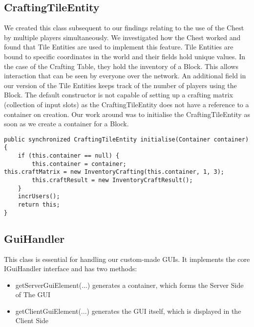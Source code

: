 \subsection{CraftingTileEntity}
We created this class subsequent to our findings relating to the use of the Chest by multiple players simultaneously. We investigated how the Chest worked and found that Tile Entities are used to implement this feature.\newline
Tile Entities are bound to specific coordinates in the world and their fields hold unique values. In the case of the Crafting Table, they hold the inventory of a Block. This allows interaction that can be seen by everyone over the network.\newline
An additional field in our version of the Tile Entities keeps track of the number of players using the Block.\newline
The default constructor is not capable of setting up a crafting matrix (collection of input slots) as the CraftingTileEntity does not have a reference to a container on creation. Our work around was to initialise the CraftingTileEntity as soon as we create a container for a Block.\newline
\begin{lstlisting}
public synchronized CraftingTileEntity initialise(Container container) {
	if (this.container == null) {
		this.container = container;
this.craftMatrix = new InventoryCrafting(this.container, 1, 3);
		this.craftResult = new InventoryCraftResult();
	}
	incrUsers();
	return this;
}
\end{lstlisting}

\subsection{GuiHandler}
This class is essential for handling our custom-made GUIs. It implements the core IGuiHandler interface and has two methods:
\begin{itemize}
\item getServerGuiElement(...)\newline
generates a container, which forms the Server Side of The GUI
\item getClientGuiElement(...)\newline
generates the GUI itself, which is displayed in the Client Side
\end{itemize}

